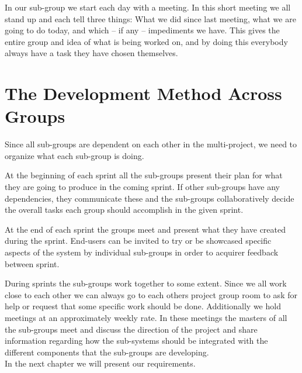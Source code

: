 In our sub-group we start each day with a \scrum{} meeting.
In this short meeting we all stand up and each tell three things: What we did since last \scrum{} meeting, what we are going to do today, and which -- if any -- impediments we have.
This gives the entire group and idea of what is being worked on, and by doing this everybody always have a task they have chosen themselves.

\section{The Development Method Across Groups} %
Since all sub-groups are dependent on each other in the multi-project, we need to organize what each sub-group is doing.

At the beginning of each sprint all the sub-groups present their plan for what they are going to produce in the coming sprint.
If other sub-groups have any dependencies, they communicate these and the sub-groups collaboratively decide the overall tasks each group should accomplish in the given sprint.

At the end of each sprint the groups meet and present what they have created during the sprint.
End-users can be invited to try or be showcased specific aspects of the system by individual sub-groups in order to acquirer feedback between sprint.

During sprints the sub-groups work together to some extent.
Since we all work close to each other we can always go to each others project group room to ask for help or request that some specific work should be done.
Additionally we hold \sos{} meetings at an approximately weekly rate.
In these meetings the \scrum{} masters of all the sub-groups meet and discuss the direction of the project and share information regarding how the sub-systems should be integrated with the different components that the sub-groups are developing.\\

In the next chapter we will present our requirements.


